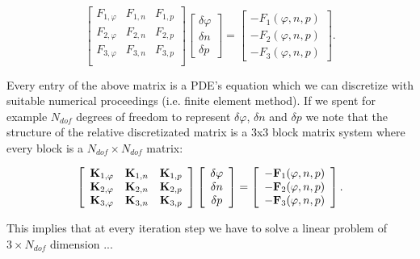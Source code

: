 \begin{equation}
\left[
\begin{array}{ccc}
F_{1,\varphi} & F_{1,n} & F_{1,p} \\
F_{2,\varphi} & F_{2,n} & F_{2,p} \\
F_{3,\varphi} & F_{3,n} & F_{3,p} \\
\end{array}
\right]
\left[
\begin{array}{c}
\delta \varphi  \\
\delta n  \\
\delta p 
\end{array}
\right]
=
\left[
\begin{array}{c}
-F_1(\varphi,n,p) \\
-F_2(\varphi,n,p)\\
-F_3(\varphi,n,p)
\end{array}
\right].
\end{equation}


 Every entry of the above matrix is a PDE's equation which we can discretize with suitable numerical proceedings (i.e. finite element method). If we spent for example $N_{dof}$ degrees of freedom to represent $\delta \varphi$, $\delta n$ and $\delta p$ we note that the structure of the relative discretizated matrix is a 3x3 block matrix system where every block is a $N_{dof} \times N_{dof}$ matrix:


\begin{equation}
\left[
\begin{array}{ccc}
\mathbf{K}_{1,\varphi} & \mathbf{K}_{1,n} & \mathbf{K}_{1,p} \\
\mathbf{K}_{2,\varphi} & \mathbf{K}_{2,n} & \mathbf{K}_{2,p} \\
\mathbf{K}_{3,\varphi} & \mathbf{K}_{3,n} & \mathbf{K}_{3,p} \\
\end{array}
\right]
\left[
\begin{array}{c}
\delta \varphi  \\
\delta n  \\
\delta p 
\end{array}
\right]
=
\left[
\begin{array}{c}
-\mathbf{F}_1(\varphi,n,p) \\
-\mathbf{F}_2(\varphi,n,p)\\
-\mathbf{F}_3(\varphi,n,p)
\end{array}
\right].
\end{equation}

This implies that at every iteration step we have to solve a linear problem of $3 \times N_{dof}$ dimension ...

